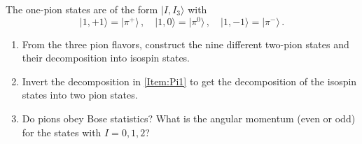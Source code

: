 The one-pion states are of the form $|I,I_{3}\rangle$ with
\begin{equation}
    |1,+1\rangle=|\pi^{+}\rangle\,,\quad |1,0\rangle=|\pi^{0}\rangle\,,\quad |1,-1\rangle=|\pi^{-}\rangle\,.
\end{equation}

\begin{enumerate}
    \item \label{Item:Pi1}
          From the three pion flavors, construct the nine different two-pion states and their decomposition into isospin states.
    \item Invert the decomposition in \eqref{Item:Pi1} to get the decomposition of the isospin states into two pion states.
    \item Do pions obey Bose statistics? What is the angular momentum (even or odd) for the states with $I=0,1,2$?
\end{enumerate}



